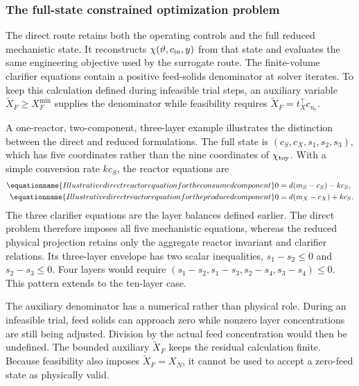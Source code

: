 \subsubsection{The full-state constrained optimization problem}

The direct route retains both the operating controls and the full reduced mechanistic state. It reconstructs $\chi(\vartheta,c_{\rm in},y)$ from that state and evaluates the same engineering objective used by the surrogate route. The finite-volume clarifier equations contain a positive feed-solids denominator at solver iterates. To keep this calculation defined during infeasible trial steps, an auxiliary variable $\widetilde X_F\ge X_F^{\min}$ supplies the denominator while feasibility requires $\widetilde X_F=t_X^\top c_{n_r}$.

A one-reactor, two-component, three-layer example illustrates the distinction between the direct and reduced formulations. The full state is $(c_S,c_X,s_1,s_2,s_3)$, which has five coordinates rather than the nine coordinates of $\chi_{\rm toy}$. With a simple conversion rate $kc_S$, the reactor equations are
\begin{align}
\equationname{Illustrative direct reactor equation for the consumed component}
0&=d(m_S-c_S)-kc_S,\\
\equationname{Illustrative direct reactor equation for the produced component}
0&=d(m_X-c_X)+kc_S.
\end{align}
The three clarifier equations are the layer balances defined earlier. The direct problem therefore imposes all five mechanistic equations, whereas the reduced physical projection retains only the aggregate reactor invariant and clarifier relations. Its three-layer envelope has two scalar inequalities, $s_1-s_2\le0$ and $s_2-s_3\le0$. Four layers would require $(s_1-s_2,s_1-s_3,s_2-s_4,s_3-s_4)\le0$. This pattern extends to the ten-layer case.

The auxiliary denominator has a numerical rather than physical role. During an infeasible trial, feed solids can approach zero while nonzero layer concentrations are still being adjusted. Division by the actual feed concentration would then be undefined. The bounded auxiliary $\widetilde X_F$ keeps the residual calculation finite. Because feasibility also imposes $\widetilde X_F=X_N$, it cannot be used to accept a zero-feed state as physically valid.

